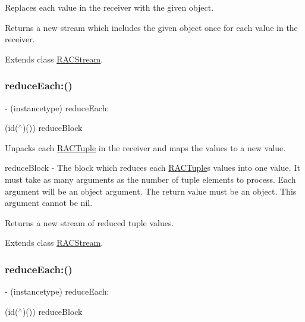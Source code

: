Replaces each value in the receiver with the given object.

Returns a new stream which includes the given object once for each value in the receiver. 

Extends class \mbox{\hyperlink{interface_r_a_c_stream_a9e55da434f4cf84e14f9133ac48383b8}{R\+A\+C\+Stream}}.

\mbox{\label{category_r_a_c_stream_07_operations_08_aaf04bf295d943b85860ae5cc3d5851ff}} 
\subsubsection{\texorpdfstring{reduce\+Each\+:()}{reduceEach:()}\hspace{0.1cm}{\footnotesize\ttfamily [1/3]}}
{\footnotesize\ttfamily -\/ (instancetype) reduce\+Each\+: \begin{DoxyParamCaption}\item[{(id($^\wedge$)())}]{reduce\+Block }\end{DoxyParamCaption}}

Unpacks each \mbox{\hyperlink{interface_r_a_c_tuple}{R\+A\+C\+Tuple}} in the receiver and maps the values to a new value.

reduce\+Block -\/ The block which reduces each \mbox{\hyperlink{interface_r_a_c_tuple}{R\+A\+C\+Tuple}}\textquotesingle{}s values into one value. It must take as many arguments as the number of tuple elements to process. Each argument will be an object argument. The return value must be an object. This argument cannot be nil.

Returns a new stream of reduced tuple values. 

Extends class \mbox{\hyperlink{interface_r_a_c_stream_aaf04bf295d943b85860ae5cc3d5851ff}{R\+A\+C\+Stream}}.

\mbox{\label{category_r_a_c_stream_07_operations_08_aaf04bf295d943b85860ae5cc3d5851ff}} 
\subsubsection{\texorpdfstring{reduce\+Each\+:()}{reduceEach:()}\hspace{0.1cm}{\footnotesize\ttfamily [2/3]}}
{\footnotesize\ttfamily -\/ (instancetype) reduce\+Each\+: \begin{DoxyParamCaption}\item[{(id($^\wedge$)())}]{reduce\+Block }\end{DoxyParamCaption}}

